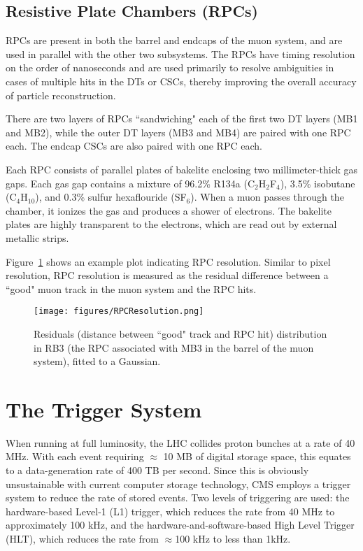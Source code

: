 \subsection{Resistive Plate Chambers (RPCs)}

RPCs are present in both the barrel and endcaps of the muon system, and are used in parallel with the other two subsystems. The RPCs have timing resolution on the order of nanoseconds and are used primarily to resolve ambiguities in cases of multiple hits in the DTs or CSCs, thereby improving the overall accuracy of particle reconstruction.

There are two layers of RPCs ``sandwiching" each of the first two DT layers (MB1 and MB2), while the outer DT layers (MB3 and MB4) are paired with one RPC each. The endcap CSCs are also paired with one RPC each. 

Each RPC consists of parallel plates of bakelite enclosing two millimeter-thick gas gaps. Each gas gap contains a mixture of 96.2\% R134a (C$_2$H$_2$F$_4$), 3.5\% isobutane (C$_4$H$_10$), and 0.3\% sulfur hexaflouride (SF$_6$). When a muon passes through the chamber, it ionizes the gas and produces a shower of electrons. The bakelite plates are highly transparent to the electrons, which are read out by external metallic strips.

Figure~\ref{fig:RPCResolution} shows an example plot indicating RPC resolution. Similar to pixel resolution, RPC resolution is measured as the residual difference between a ``good" muon track in the muon system and the RPC hits.\cite{Muon}

\begin{figure}\centering
  \texttt{[image: figures/RPCResolution.png]}
  \caption{\label{fig:RPCResolution} Residuals (distance between ``good" track and RPC hit) distribution in RB3 (the RPC associated with MB3 in the barrel of the muon system), fitted to a Gaussian.}
\end{figure}


\section{The Trigger System}

When running at full luminosity, the LHC collides proton bunches at a rate of 40 MHz. With each event requiring $\approx$ 10 MB of digital storage space, this equates to a data-generation rate of 400 TB per second. Since this is obviously unsustainable with current computer storage technology, CMS employs a trigger system to reduce the rate of stored events. Two levels of triggering are used: the hardware-based Level-1 (L1) trigger, which reduces the rate from 40 MHz to approximately 100 kHz, and the hardware-and-software-based High Level Trigger (HLT), which reduces the rate from $\approx$100 kHz to less than 1kHz.\cite{TDR}


